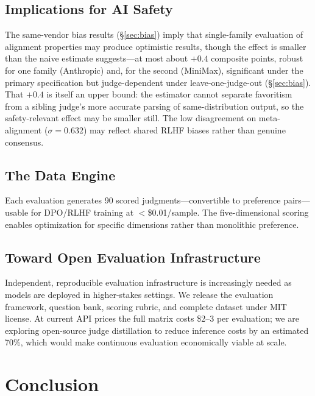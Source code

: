 \documentclass{article}
\begin{document}
\subsection{Implications for AI Safety}

The same-vendor bias results (\S\ref{sec:bias}) imply that single-family evaluation of alignment properties may produce optimistic results, though the effect is smaller than the naive estimate suggests---at most about $+0.4$ composite points, robust for one family (Anthropic) and, for the second (MiniMax), significant under the primary specification but judge-dependent under leave-one-judge-out (\S\ref{sec:bias}). That $+0.4$ is itself an upper bound: the estimator cannot separate favoritism from a sibling judge's more accurate parsing of same-distribution output, so the safety-relevant effect may be smaller still. The low disagreement on meta-alignment ($\sigma = 0.632$) may reflect shared RLHF biases rather than genuine consensus.

\subsection{The Data Engine}

Each evaluation generates 90 scored judgments---convertible to preference pairs---usable for DPO/RLHF training at $<$\$0.01/sample. The five-dimensional scoring enables optimization for specific dimensions rather than monolithic preference.

\subsection{Toward Open Evaluation Infrastructure}

Independent, reproducible evaluation infrastructure is increasingly needed as models are deployed in higher-stakes settings. We release the evaluation framework, question bank, scoring rubric, and complete dataset under MIT license. At current API prices the full matrix costs \$2--3 per evaluation; we are exploring open-source judge distillation to reduce inference costs by an estimated 70\%, which would make continuous evaluation economically viable at scale.


\section{Conclusion}
\end{document}
